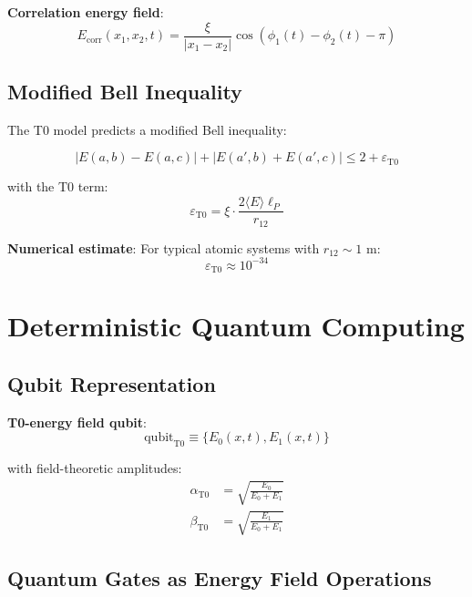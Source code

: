 \documentclass[12pt,a4paper]{article}
\newcommand{\xipar}{\xi}
\begin{document}
	\textbf{Correlation energy field}:
	\begin{equation}
		\boxed{E_{\mathrm{corr}}(x_1, x_2, t) = \frac{\xipar}{|x_1 - x_2|} \cos(\phi_1(t) - \phi_2(t) - \pi)}
		\label{eq:correlation_field}
	\end{equation}
	
	\subsection{Modified Bell Inequality}
	
	The T0 model predicts a modified Bell inequality:
	
	\begin{equation}
		\boxed{|E(a,b) - E(a,c)| + |E(a',b) + E(a',c)| \leq 2 + \varepsilon_{\mathrm{T0}}}
	\end{equation}
	
	with the T0 term:
	\begin{equation}
		\boxed{\varepsilon_{\mathrm{T0}} = \xipar \cdot \frac{2\langle E \rangle \ell_P}{r_{12}}}
		\label{eq:bell_correction}
	\end{equation}
	
	\textbf{Numerical estimate}:
	For typical atomic systems with $r_{12} \sim 1$ m:
	\begin{equation}
		\varepsilon_{\mathrm{T0}} \approx 10^{-34}
	\end{equation}
	
	\section{Deterministic Quantum Computing}
	
	\subsection{Qubit Representation}
	
	\textbf{T0-energy field qubit}:
	\begin{equation}
		\boxed{\text{qubit}_{\mathrm{T0}} \equiv \{E_0(x,t), E_1(x,t)\}}
	\end{equation}
	
	with field-theoretic amplitudes:
	\begin{align}
		\alpha_{\mathrm{T0}} &= \sqrt{\frac{E_0}{E_0 + E_1}} \\
		\beta_{\mathrm{T0}} &= \sqrt{\frac{E_1}{E_0 + E_1}}
	\end{align}
	
	\subsection{Quantum Gates as Energy Field Operations}
	
\end{document}
